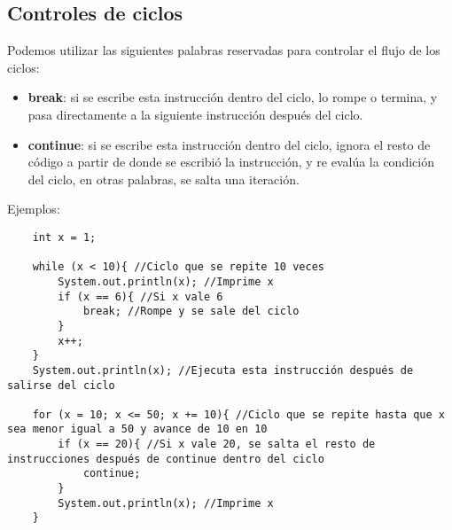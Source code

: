 \subsection{Controles de ciclos}
Podemos utilizar las siguientes palabras reservadas para controlar el flujo de los ciclos:
\begin{itemize}
    \item \textbf{break}: si se escribe esta instrucción dentro del ciclo, lo rompe o termina, y pasa directamente a la siguiente instrucción después del ciclo.
    \item \textbf{continue}: si se escribe esta instrucción dentro del ciclo, ignora el resto de código a partir de donde se escribió la instrucción, y re evalúa la condición del ciclo, en otras palabras, se salta una iteración.
\end{itemize}
Ejemplos:
\begin{lstlisting}
    int x = 1;
    
    while (x < 10){ //Ciclo que se repite 10 veces
        System.out.println(x); //Imprime x
        if (x == 6){ //Si x vale 6
            break; //Rompe y se sale del ciclo
        }
        x++;
    }  
    System.out.println(x); //Ejecuta esta instrucción después de salirse del ciclo
    
    for (x = 10; x <= 50; x += 10){ //Ciclo que se repite hasta que x sea menor igual a 50 y avance de 10 en 10
        if (x == 20){ //Si x vale 20, se salta el resto de instrucciones después de continue dentro del ciclo
            continue;
        }
        System.out.println(x); //Imprime x
    }
\end{lstlisting}




